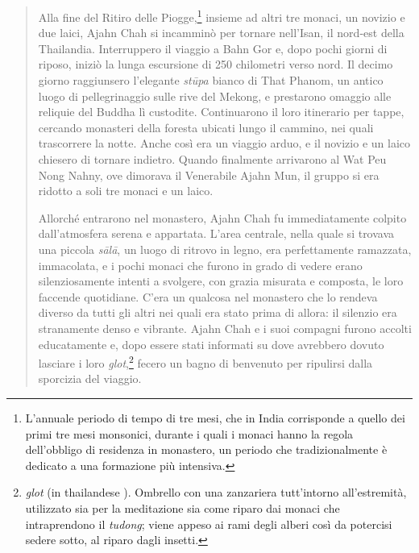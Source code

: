 \begin{quote}
Alla fine del Ritiro delle Piogge,\footnote{L'annuale periodo di tempo
  di tre mesi, che in India corrisponde a quello dei primi tre mesi
  monsonici, durante i quali i monaci hanno la regola dell'obbligo di
  residenza in monastero, un periodo che tradizionalmente è dedicato a
  una formazione più intensiva.} insieme ad altri tre monaci, un novizio
e due laici, Ajahn Chah si incamminò per tornare nell'Isan, il nord-est
della Thailandia. Interruppero il viaggio a Bahn Gor e, dopo pochi
giorni di riposo, iniziò la lunga escursione di 250 chilometri verso
nord. Il decimo giorno raggiunsero l'elegante \emph{stūpa} bianco di
That Phanom, un antico luogo di pellegrinaggio sulle rive del Mekong, e
prestarono omaggio alle reliquie del Buddha lì custodite. Continuarono
il loro itinerario per tappe, cercando monasteri della foresta ubicati
lungo il cammino, nei quali trascorrere la notte. Anche così era un
viaggio arduo, e il novizio e un laico chiesero di tornare indietro.
Quando finalmente arrivarono al Wat Peu Nong Nahny, ove dimorava il
Venerabile Ajahn Mun, il gruppo si era ridotto a soli tre monaci e un
laico.

Allorché entrarono nel monastero, Ajahn Chah fu immediatamente colpito
dall'atmosfera serena e appartata. L'area centrale, nella quale si
trovava una piccola \emph{sālā}, un luogo di ritrovo in legno, era
perfettamente ramazzata, immacolata, e i pochi monaci che furono in
grado di vedere erano silenziosamente intenti a svolgere, con grazia
misurata e composta, le loro faccende quotidiane. C'era un qualcosa nel
monastero che lo rendeva diverso da tutti gli altri nei quali era stato
prima di allora: il silenzio era stranamente denso e vibrante. Ajahn
Chah e i suoi compagni furono accolti educatamente e, dopo essere stati
informati su dove avrebbero dovuto lasciare i loro
\emph{glot},\footnote{\emph{glot} (in thailandese ). Ombrello con
  una zanzariera tutt'intorno all'estremità, utilizzato sia per la
  meditazione sia come riparo dai monaci che intraprendono il
  \emph{tudong}; viene appeso ai rami degli alberi così da potercisi
  sedere sotto, al riparo dagli insetti.} fecero un bagno di benvenuto
per ripulirsi dalla sporcizia del viaggio.


\end{quote}
